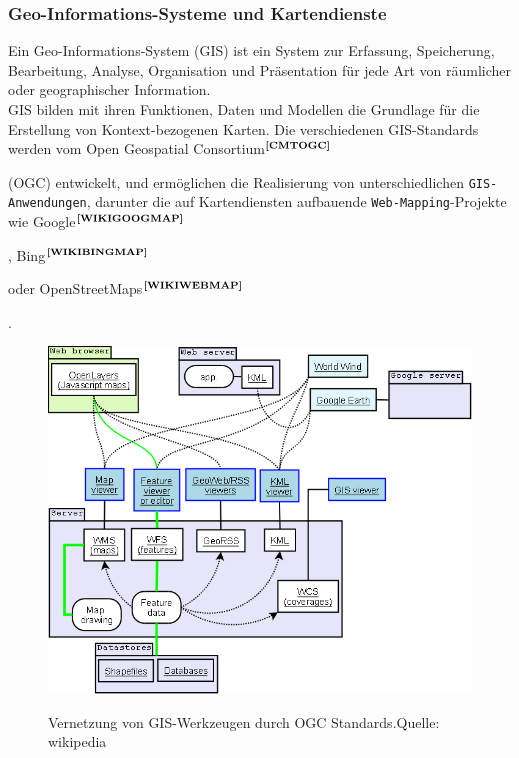 \subsubsection{Geo-Informations-Systeme und Kartendienste}
Ein Geo-Informations-System (GIS) ist ein System zur Erfassung, Speicherung,  Bearbeitung, Analyse, Organisation und Präsentation für jede Art von räumlicher oder geographischer Information.\cite{GIS:WIKIDEF} \\
GIS bilden mit ihren Funktionen, Daten und Modellen die Grundlage für die Erstellung von Kontext-bezogenen Karten. Die verschiedenen GIS-Standards werden vom Open Geospatial Consortium$^{\textbf{\ref{CMTOGC}}}$%
\addtocounter{footnote}{1}%
 (OGC) entwickelt, und ermöglichen die Realisierung von unterschiedlichen \texttt{GIS-Anwendungen}, darunter die auf Kartendiensten aufbauende \texttt{Web-Mapping}-Projekte wie Google$^{\textbf{\ref{WIKIGOOGMAP}}}$%
\addtocounter{footnote}{1}%
, Bing$^{\textbf{\ref{WIKIBINGMAP}}}$%
\addtocounter{footnote}{1}%
oder OpenStreetMaps$^{\textbf{\ref{WIKIWEBMAP}}}$%
\addtocounter{footnote}{1}%
.

  \begin{figure}
      \centering
	  \includegraphics[scale=0.3]{bilder/Geoservices_server_with_apps.png}\\ \vspace{0.8cm}
  	  \caption{Vernetzung von GIS-Werkzeugen durch OGC Standards.\newline Quelle: wikipedia}
  \end{figure}

